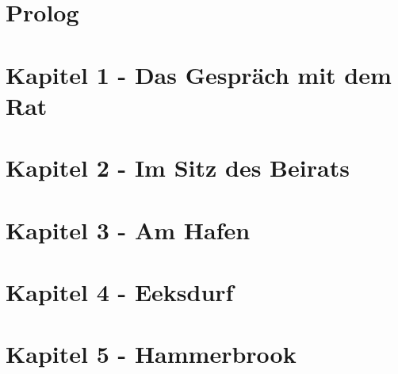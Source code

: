 
\section{\textbf{Prolog}}


\section{\textbf{Kapitel 1 - Das Gespräch mit dem Rat}}



\section{\textbf{Kapitel 2 - Im Sitz des Beirats}}



\section{\textbf{Kapitel 3 - Am Hafen}}
\label{Hafen}


\section{\textbf{Kapitel 4 - Eeksdurf}}
\label{xd}


\section{\textbf{Kapitel 5 - Hammerbrook}}
\label{arm}
%
